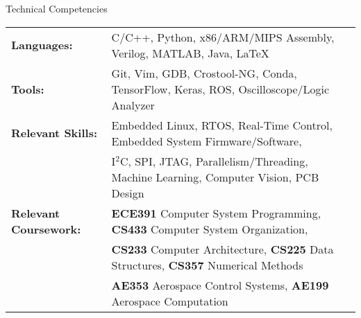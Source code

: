 \documentclass{resume} %
\begin{document}

    \begin{rSection} {Technical Competencies}

        \begin{tabular}{ @{} >{\bfseries}l @{\hspace{2ex}} l }

        Languages: & C/C++, Python, x86/ARM/MIPS Assembly, Verilog, MATLAB, Java, LaTeX \\
        Tools: & Git, Vim, GDB, Crostool-NG, Conda, TensorFlow, Keras, ROS, Oscilloscope/Logic Analyzer \\
        Relevant Skills: & Embedded Linux, RTOS, Real-Time Control, Embedded System Firmware/Software, \\ & I$^2$C, SPI, JTAG, Parallelism/Threading, Machine Learning, Computer Vision, PCB Design \\
		Relevant Coursework: & \textbf{ECE391} Computer System Programming, \textbf{CS433} Computer System Organization,\\ & \textbf{CS233} Computer Architecture, \textbf{CS225} Data Structures, \textbf{CS357} Numerical Methods \\ & \textbf{AE353} Aerospace Control Systems, \textbf{AE199} Aerospace Computation

        \end{tabular}

    \end{rSection}

\end{document}
